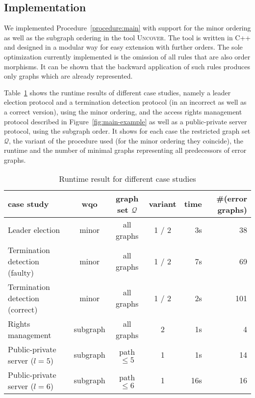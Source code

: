 \documentclass{llncs}
\begin{document}

\subsection{Implementation}

We implemented Procedure~\ref{procedure:main} with support for the
minor ordering as well as the subgraph ordering in the tool
\textsc{Uncover}. The tool is written in C++ and designed in a modular
way for easy extension with further orders. The sole optimization
currently implemented is the omission of all rules that are also
order morphisms. It can be shown that the backward application of such
rules produces only graphs which are already represented.  

Table~\ref{fig:runtime-results} shows the runtime results of
different case studies, namely a leader election protocol and a
termination detection protocol (in an incorrect as well as a correct
version), using the minor ordering, and the access rights management
protocol described in Figure~\ref{fig:main-example} as well as a
public-private server protocol, using the subgraph order. It shows for
each case the restricted graph set $\mathcal{Q}$, the variant of the
procedure used (for the minor ordering they coincide), the runtime and
the number of minimal graphs representing all predecessors of error
graphs.

\begin{table}[h]
\caption{Runtime result for different case studies}
  \label{fig:runtime-results}
  \centering
  \begin{tabular}{l|c|c|c|r|r}
    \hline
    case study & wqo & graph set $\mathcal{Q}$ & variant & time & \#(error 
    graphs)
    \\\hline\hline
    Leader election & minor & all graphs & 1 / 2 & 3s & 38 \\\hline
    Termination detection (faulty) & minor & all graphs & 1 / 2 & 7s & 69 \\\hline
    Termination detection (correct) & minor & all graphs & 1 / 2 & 2s & 101 
    \\\hline
    Rights management & subgraph & all graphs & 2 & 1s & 4 \\\hline
    Public-private server ($l = 5$) & subgraph & path $\leq 5$ & 1 & 1s 
    & 14 \\\hline
    Public-private server ($l = 6$) & subgraph & path $\leq 6$ & 1 & 
    16s & 16 \\\hline
  \end{tabular}
\end{table}
\end{document}
